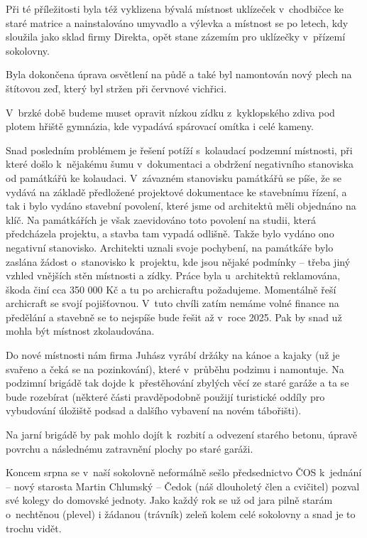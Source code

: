 \documentclass[11pt]{article}
\begin{document}
Při té příležitosti byla též vyklizena bývalá místnost uklízeček v~chodbičce ke staré matrice a nainstalováno umyvadlo a výlevka a místnost se po letech, kdy sloužila jako sklad firmy Direkta, opět stane zázemím pro uklízečky v~přízemí sokolovny.

Byla dokončena úprava osvětlení na půdě a také byl namontován nový plech na štítovou zeď, který byl stržen při červnové vichřici.

V~brzké době budeme muset opravit nízkou zídku z~kyklopského zdiva pod plotem hřiště gymnázia, kde vypadává spárovací omítka i celé kameny.

Snad posledním problémem je řešení potíží s~kolaudací podzemní místnosti, při které došlo k~nějakému šumu v~dokumentaci a obdržení negativního stanoviska od památkářů ke kolaudaci. V~závazném stanovisku památkářů se píše, že se vydává na základě předložené projektové dokumentace ke stavebnímu řízení, a tak i bylo vydáno stavební povolení, které jsme od architektů měli objednáno na klíč. Na památkářích je však zaevidováno toto povolení na studii, která předcházela projektu, a stavba tam vypadá odlišně. Takže bylo vydáno ono negativní stanovisko. Architekti uznali svoje pochybení, na památkáře bylo zaslána žádost o~stanovisko k~projektu, kde jsou nějaké podmínky – třeba jiný vzhled vnějších stěn místnosti a zídky. Práce byla u~architektů reklamována, škoda činí cca 350 000 Kč a tu po archicraftu požadujeme. Momentálně řeší archicraft se svojí pojišťovnou. V~tuto chvíli zatím nemáme volné finance na předělání a stavebně se to nejspíše bude řešit až v~roce 2025. Pak by snad už mohla být místnost zkolaudována.

Do nové místnosti nám firma Juhász vyrábí držáky na kánoe a kajaky (už je svařeno a čeká se na pozinkování), které v~průběhu podzimu i namontuje. Na podzimní brigádě tak dojde k~přestěhování zbylých věcí ze staré garáže a ta se bude rozebírat (některé části pravděpodobně použijí turistické oddíly pro vybudování úložiště podsad a dalšího vybavení na novém tábořišti).

Na jarní brigádě by pak mohlo dojít k~rozbití a odvezení starého betonu, úpravě povrchu a následnému zatravnění plochy po staré garáži.

Koncem srpna se v~naší sokolovně neformálně sešlo předsednictvo ČOS k~jednání – nový starosta Martin Chlumský – Čedok (náš dlouholetý člen a cvičitel) pozval své kolegy do domovské jednoty.
Jako každý rok se už od jara pilně starám o~nechtěnou (plevel) i žádanou (trávník) zeleň kolem celé sokolovny a snad je to trochu vidět.
\end{document}
